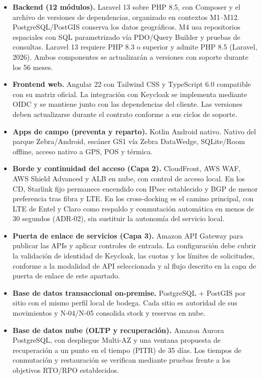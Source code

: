\begin{itemize}
\item \textbf{Backend (12 módulos).} Laravel 13 sobre PHP 8.5, con Composer y el archivo de versiones de dependencias, organizado en contextos M1–M12. PostgreSQL/PostGIS conserva los datos geográficos. M4 usa repositorios espaciales con SQL parametrizado vía PDO/Query Builder y pruebas de consultas. Laravel 13 requiere PHP 8.3 o superior y admite PHP 8.5 (Laravel, 2026). Ambos componentes se actualizarán a versiones con soporte durante los 56 meses.

\item \textbf{Frontend web.} Angular 22 con Tailwind CSS y TypeScript 6.0 compatible con su matriz oficial. La integración con Keycloak se implementa mediante OIDC y se mantiene junto con las dependencias del cliente. Las versiones deben actualizarse durante el contrato conforme a sus ciclos de soporte.

\item \textbf{Apps de campo (preventa y reparto).} Kotlin Android nativo. Nativo del parque Zebra/Android, escáner GS1 vía Zebra DataWedge, SQLite/Room offline, acceso nativo a GPS, POS y térmica.

\item \textbf{Borde y continuidad del acceso (Capa 2).} CloudFront, AWS WAF, AWS Shield Advanced y ALB en nube, con control de acceso local. En los CD, Starlink fijo permanece encendido con IPsec establecido y BGP de menor preferencia tras fibra y LTE. En los cross-docking es el camino principal, con LTE de Entel y Claro como respaldo y conmutación automática en menos de 30 segundos (ADR-02), sin sustituir la autonomía del servicio local.

\item \textbf{Puerta de enlace de servicios (Capa 3).} Amazon API Gateway para publicar las APIs y aplicar controles de entrada. La configuración debe cubrir la validación de identidad de Keycloak, las cuotas y los límites de solicitudes, conforme a la modalidad de API seleccionada y al flujo descrito en la capa de puerta de enlace de este apartado.

\item \textbf{Base de datos transaccional on-premise.} PostgreSQL + PostGIS por sitio con el mismo perfil local de bodega. Cada sitio es autoridad de sus movimientos y N-04/N-05 consolida stock y reservas en nube.

\item \textbf{Base de datos nube (OLTP y recuperación).} Amazon Aurora PostgreSQL, con despliegue Multi-AZ y una ventana propuesta de recuperación a un punto en el tiempo (PITR) de 35 días. Los tiempos de conmutación y restauración se verifican mediante pruebas frente a los objetivos RTO/RPO establecidos.


\end{itemize}
